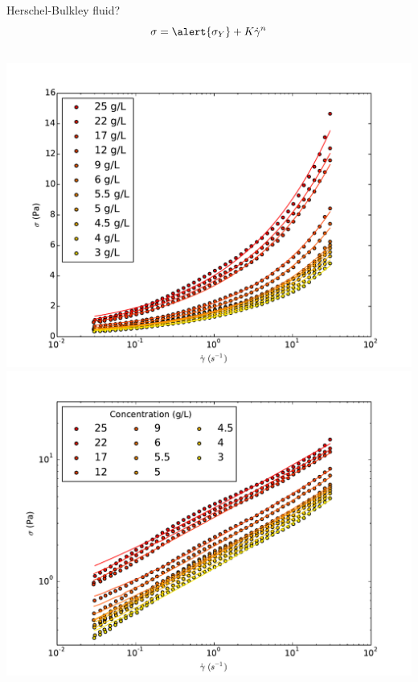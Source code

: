 \documentclass[xcolor=table]{beamer}
\begin{document}
\begin{frame}{Herschel-Bulkley fluid?}
\[ \sigma = \alert{\sigma_Y} + K \dot{\gamma}^n \]
\begin{columns}
\includegraphics[width=\textwidth]{HershelBuckley_only_r1}
\includegraphics[width=\textwidth]{HershelBuckley_loglog_r1}
\end{columns}
\end{frame}
\end{document}

